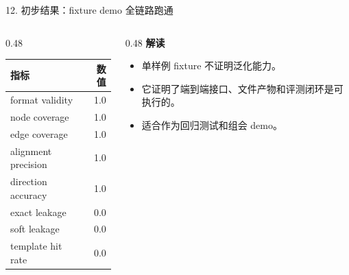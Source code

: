\documentclass[aspectratio=169,UTF8]{ctexbeamer}
\begin{document}
\begin{frame}{12. 初步结果：fixture demo 全链路跑通}
  \begin{columns}[T,onlytextwidth]
    \begin{column}{0.48\textwidth}
      \small
      \begin{tabular}{lr}
        \toprule
        指标 & 数值 \\
        \midrule
        format validity & 1.0 \\
        node coverage & 1.0 \\
        edge coverage & 1.0 \\
        alignment precision & 1.0 \\
        direction accuracy & 1.0 \\
        exact leakage & 0.0 \\
        soft leakage & 0.0 \\
        template hit rate & 0.0 \\
        \bottomrule
      \end{tabular}
    \end{column}
    \begin{column}{0.48\textwidth}
      \textbf{解读}
      \begin{itemize}
        \item 单样例 fixture 不证明泛化能力。
        \item 它证明了端到端接口、文件产物和评测闭环是可执行的。
        \item 适合作为回归测试和组会 demo。
      \end{itemize}
    \end{column}
  \end{columns}
\end{frame}
\end{document}
